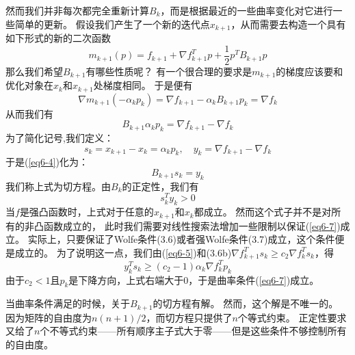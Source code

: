 \documentclass{article}
\begin{document}
然而我们并非每次都完全重新计算$B_k$，而是根据最近的一些曲率变化对它进行一些简单的更新。
假设我们产生了一个新的迭代点$x_{k+1}$，从而需要去构造一个具有如下形式的新的二次函数
\[
    m_{k+1}(p) = f_{k+1} + \nabla f_{k+1}^Tp + \frac12 p^TB_{k+1}p
\]
那么我们希望$B_{k+1}$有哪些性质呢？
有一个很合理的要求是$m_{k+1}$的梯度应该要和优化对象在$x_k$和$x_{k+1}$处梯度相同。
于是便有
\[
    \nabla m_{k+1}(-\alpha_k p_k) = \nabla f_{k+1} - \alpha_k B_{k+1}p_k = \nabla f_k
\]
从而我们有
\begin{equation}
    \label{eq6-4}
    B_{k+1}\alpha_kp_k = \nabla f_{k+1} - \nabla f_k
\end{equation}
为了简化记号,我们定义：
\begin{equation}
    \label{eq6-5}
    s_k = x_{k+1} - x_k = \alpha_kp_k, \quad y_k = \nabla f_{k+1} - \nabla f_k
\end{equation}
于是(\ref{eq6-4})化为：
\begin{equation}
    \label{eq6-6}
    B_{k+1} s_k = y_k
\end{equation}
我们称上式为切方程。由$B_k$的正定性，我们有
\begin{equation}
    \label{eq6-7}
    s_k^Ty_k >0
\end{equation}
当$f$是强凸函数时，上式对于任意的$x_{k+1}$和$x_k$都成立。
然而这个式子并不是对所有的非凸函数成立的，
此时我们需要对线性搜索法增加一些限制以保证(\ref{eq6-7})成立。
实际上，只要保证了Wolfe条件(3.6)或者强Wolfe条件(3.7)成立，这个条件便是成立的。
为了说明这一点，我们由(\ref{eq6-5})和(3.6b)$\nabla f_{k+1}^Ts_k\ge c_2\nabla f_k^T s_k$，得
\begin{equation}
    \label{eq6-8}
    y_k^Ts_k \ge (c_2 - 1) \alpha_k \nabla f_k^T p_k
\end{equation}
由于$c_2<1$且$p_k$是下降方向，上式右端大于0，于是曲率条件(\ref{eq6-7})成立。

当曲率条件满足的时候，关于$B_{k+1}$的切方程有解。
然而，这个解是不唯一的。
因为矩阵的自由度为$n(n+1)/2$，而切方程只提供了$n$个等式约束。
正定性要求又给了$n$个不等式约束——所有顺序主子式大于零——但是这些条件不够控制所有的自由度。
\end{document}
